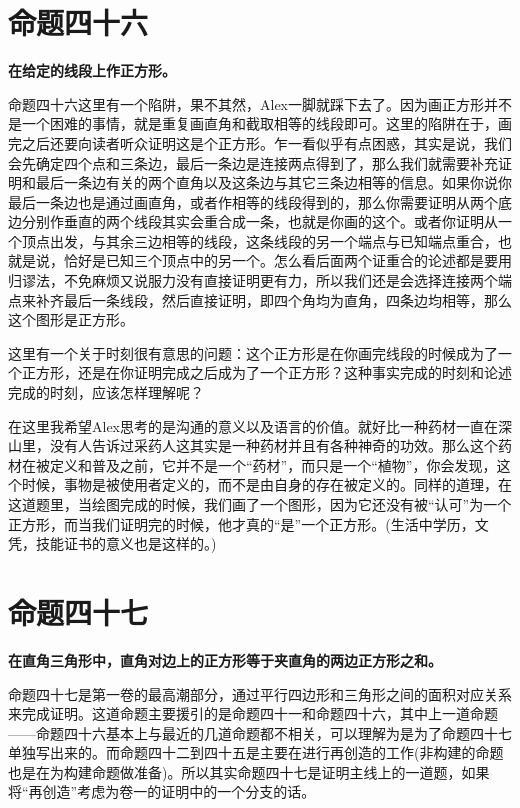\documentclass[
]{book}
\begin{document}
\hypertarget{ux547dux9898ux56dbux5341ux516d}{%
\section{命题四十六}\label{ux547dux9898ux56dbux5341ux516d}}

\textbf{在给定的线段上作正方形。}

命题四十六这里有一个陷阱，果不其然，Alex一脚就踩下去了。因为画正方形并不是一个困难的事情，就是重复画直角和截取相等的线段即可。这里的陷阱在于，画完之后还要向读者听众证明这是个正方形。乍一看似乎有点困惑，其实是说，我们会先确定四个点和三条边，最后一条边是连接两点得到了，那么我们就需要补充证明和最后一条边有关的两个直角以及这条边与其它三条边相等的信息。如果你说你最后一条边也是通过画直角，或者作相等的线段得到的，那么你需要证明从两个底边分别作垂直的两个线段其实会重合成一条，也就是你画的这个。或者你证明从一个顶点出发，与其余三边相等的线段，这条线段的另一个端点与已知端点重合，也就是说，恰好是已知三个顶点中的另一个。怎么看后面两个证重合的论述都是要用归谬法，不免麻烦又说服力没有直接证明更有力，所以我们还是会选择连接两个端点来补齐最后一条线段，然后直接证明，即四个角均为直角，四条边均相等，那么这个图形是正方形。

这里有一个关于时刻很有意思的问题：这个正方形是在你画完线段的时候成为了一个正方形，还是在你证明完成之后成为了一个正方形？这种事实完成的时刻和论述完成的时刻，应该怎样理解呢？

在这里我希望Alex思考的是沟通的意义以及语言的价值。就好比一种药材一直在深山里，没有人告诉过采药人这其实是一种药材并且有各种神奇的功效。那么这个药材在被定义和普及之前，它并不是一个``药材''，而只是一个``植物''，你会发现，这个时候，事物是被使用者定义的，而不是由自身的存在被定义的。同样的道理，在这道题里，当绘图完成的时候，我们画了一个图形，因为它还没有被``认可''为一个正方形，而当我们证明完的时候，他才真的``是''一个正方形。(生活中学历，文凭，技能证书的意义也是这样的。)

\hypertarget{ux547dux9898ux56dbux5341ux4e03}{%
\section{命题四十七}\label{ux547dux9898ux56dbux5341ux4e03}}

\textbf{在直角三角形中，直角对边上的正方形等于夹直角的两边正方形之和。}

命题四十七是第一卷的最高潮部分，通过平行四边形和三角形之间的面积对应关系来完成证明。这道命题主要援引的是命题四十一和命题四十六，其中上一道命题------命题四十六基本上与最近的几道命题都不相关，可以理解为是为了命题四十七单独写出来的。而命题四十二到四十五是主要在进行再创造的工作(非构建的命题也是在为构建命题做准备)。所以其实命题四十七是证明主线上的一道题，如果将``再创造''考虑为卷一的证明中的一个分支的话。
\end{document}
